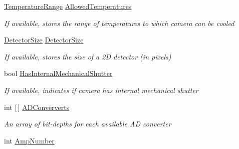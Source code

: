 \begin{DoxyCompactItemize}
\item 
\hyperlink{struct_a_n_d_o_r___c_s_1_1_data_structures_1_1_temperature_range}{Temperature\+Range} \hyperlink{struct_a_n_d_o_r___c_s_1_1_data_structures_1_1_camera_properties_a4bf18fdd049e317dc35d2a0992331250}{Allowed\+Temperatures}
\begin{DoxyCompactList}\small\item\em If available, stores the range of temperatures to which camera can be cooled \end{DoxyCompactList}\item 
\hyperlink{struct_a_n_d_o_r___c_s_1_1_data_structures_1_1_detector_size}{Detector\+Size} \hyperlink{struct_a_n_d_o_r___c_s_1_1_data_structures_1_1_camera_properties_a2f4375c01d8bba4637c0db7651031f3d}{Detector\+Size}
\begin{DoxyCompactList}\small\item\em If available, stores the size of a 2D detector (in pixels) \end{DoxyCompactList}\item 
bool \hyperlink{struct_a_n_d_o_r___c_s_1_1_data_structures_1_1_camera_properties_aec515a7c3b7f51a2c77f8613b84a6bf2}{Has\+Internal\+Mechanical\+Shutter}
\begin{DoxyCompactList}\small\item\em If available, indicates if camera has internal mechanical shutter \end{DoxyCompactList}\item 
int \mbox{[}$\,$\mbox{]} \hyperlink{struct_a_n_d_o_r___c_s_1_1_data_structures_1_1_camera_properties_ab0203f6cd04c197000e312cff3e7990d}{A\+D\+Conververts}
\begin{DoxyCompactList}\small\item\em An array of bit-\/depths for each available AD converter \end{DoxyCompactList}\item 
int \hyperlink{struct_a_n_d_o_r___c_s_1_1_data_structures_1_1_camera_properties_a7da79353311054ac8a9187bd4a913928}{Amp\+Number}

\end{DoxyCompactItemize}
